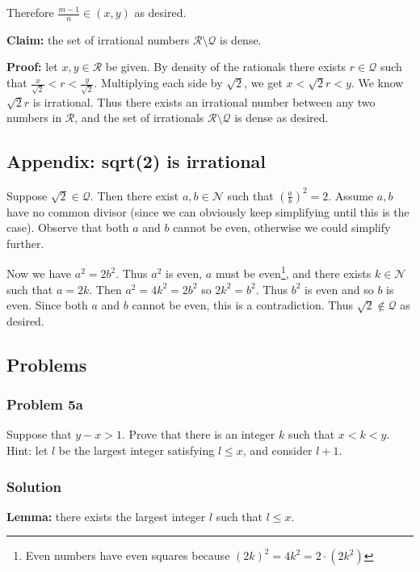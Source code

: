\vs

Therefore $\frac{m-1}{n}\in(x,y)$ as desired.

\vs

\textbf{Claim:} the set of irrational numbers $\mathcal{R}\setminus\mathcal{Q}$ is dense.

\textbf{Proof:} let $x,y\in\mathcal{R}$ be given. By density of the rationals
there exists $r\in\mathcal{Q}$ such that
$\frac{x}{\sqrt{2}}<r<\frac{y}{\sqrt{2}}$. Multiplying each side by
$\sqrt{2}$, we get $x<\sqrt{2}r<y$. We know $\sqrt{2}r$ is irrational.
Thus there exists an irrational number between any two numbers in
$\mathcal{R}$, and the set of irrationals $\mathcal{R}\setminus\mathcal{Q}$ is dense as desired.

\subsection{Appendix: sqrt(2) is irrational}\label{sqrt2proof}
Suppose $\sqrt{2}\in\mathcal{Q}$. Then there exist $a,b\in\mathcal{N}$ such that
$\left(\frac{a}{b}\right)^{2}=2$. Assume $a, b$ have no common divisor
(since we can obviously keep simplifying until this is the case).
Observe that both $a$ and $b$ cannot be even, otherwise we could
simplify further.

\vs

Now we have $a^{2}=2b^{2}$. Thus $a^{2}$ is even, $a$ must be
even\footnote{Even numbers have even squares because
  ${(2k)}^{2}=4k^{2}=2\cdot(2k^{2})$}, and there exists
$k\in\mathcal{N}$ such that $a=2k$. Then $a^{2}=4k^{2}=2b^{2}$ so
$2k^{2}=b^{2}$. Thus $b^{2}$ is even and so $b$ is even. Since both
$a$ and $b$ cannot be even, this is a contradiction. Thus
$\sqrt{2}\notin\mathcal{Q}$ as desired.

\subsection{Problems}
\subsubsection*{Problem 5a}
Suppose that $y-x>1$. Prove that there is an integer $k$ such that
$x<k<y$. Hint: let $l$ be the largest integer satisfying $l\leq x$, and
consider $l+1$.

\subsubsection*{Solution}
\textbf{Lemma:} there exists the largest integer $l$ such that $l\leq x$.

